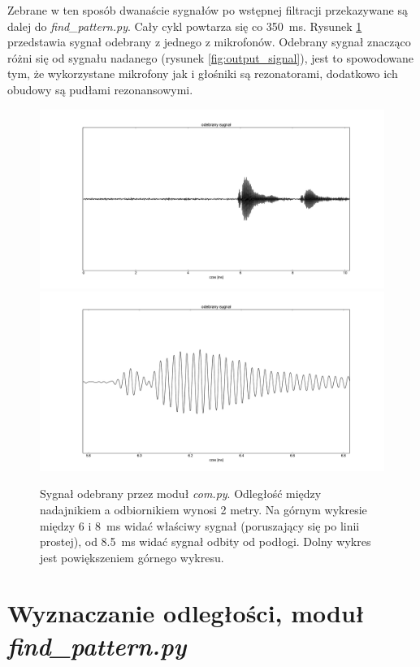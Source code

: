 Zebrane w ten sposób dwanaście sygnałów po wstępnej filtracji przekazywane są dalej do \textit{find\_pattern.py}. Cały cykl powtarza 
się co \SI{350}{ms}.
Rysunek \ref{fig:com_output_2m} przedstawia sygnał odebrany z jednego z mikrofonów.
Odebrany sygnał znacząco różni się od sygnału nadanego (rysunek \ref{fig:output_signal}),
jest to spowodowane tym, że wykorzystane mikrofony jak i głośniki są rezonatorami, dodatkowo 
ich obudowy są pudłami rezonansowymi.


\begin{figure}[p]
    \centering
    \includegraphics[width=1.0\textwidth, trim= 50mm 0mm 40mm 0mm,clip]{com_output_2m_1}
    \includegraphics[width=1.0\textwidth, trim= 50mm 0mm 40mm 0mm,clip]{com_output_2m_2}
    \caption{Sygnał odebrany przez moduł \textit{com.py}. 
    Odległość między nadajnikiem a odbiornikiem wynosi 2 metry.
    Na górnym wykresie między 6 i \SI{8}{ms} widać właściwy sygnał (poruszający się po linii prostej), od \SI{8.5}{ms}
   widać sygnał odbity od podłogi. 
    Dolny wykres jest powiększeniem górnego wykresu.}
    \label{fig:com_output_2m}
\end{figure}

\section{Wyznaczanie odległości, moduł \textit{find\_pattern.py}}

